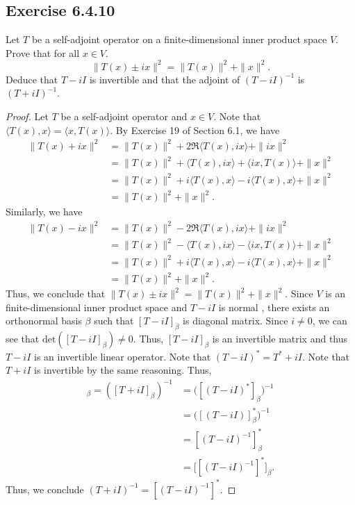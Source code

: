 \subsection*{Exercise 6.4.10} Let \( T  \) be a self-adjoint operator on a finite-dimensional inner product space \( V  \). Prove that for all \( x \in V  \).
\[ \|T(x) \pm ix\|^{2} = \|T(x)\|^{2} + \|x\|^{2}.  \]
Deduce that \( T - i I  \) is invertible and that the adjoint of \( (T - iI )^{-1} \) is \( (T + i I )^{-1} \).
\begin{proof}
Let \( T  \) be a self-adjoint operator and \( x \in V  \). Note that \( \langle T(x)  , x  \rangle = \langle x , T(x) \rangle \). By Exercise 19 of Section 6.1, we have
\begin{align*}
    \|T(x) + ix \|^{2} &= \|T(x)\|^{2} + 2 \Re \langle T(x) , ix  \rangle + \|ix \|^{2} \\
                       &= \|T(x)\|^{2} + \langle T(x)  , ix  \rangle + \langle ix  , T(x)  \rangle + \|x\|^{2}  \\
                       &= \|T(x)\|^{2} +  i \langle T(x)   , x \rangle - i \langle T(x)  , x  \rangle + \|x\|^{2} \\  
                       &= \|T(x)\|^{2} + \|x\|^{2}.
\end{align*}
Similarly, we have
\begin{align*}
    \|T(x) - ix \|^{2} &= \|T(x)\|^{2} - 2 \Re \langle T(x) , ix  \rangle + \|ix\|^{2} \\
                       &= \|T(x)\|^{2} - \langle T(x)  , ix  \rangle - \langle ix , T(x) \rangle + \|x\|^{2} \\
                       &= \|T(x)\|^{2} + i \langle T(x)  , x  \rangle - i \langle T(x)  , x  \rangle + \|x\|^{2} \\
                       &= \|T(x)\|^{2} + \|x\|^{2}.
\end{align*}
Thus, we conclude that \( \|T(x) \pm ix\|^{2} = \|T(x)\|^{2} + \|x\|^{2} \). Since \( V  \) is an finite-dimensional inner product space and \( T - iI  \) is normal , there exists an orthonormal basis \(  \beta \) such that  \( [T - iI]_{\beta} \) is diagonal matrix. Since \( i \neq 0  \), we can see that \( \text{det}([T - i I ]_{\beta}) \neq 0  \). Thus, \( [T - iI ]_{\beta} \) is an invertible matrix and thus \( T - iI  \) is an invertible linear operator. Note that \( (T - iI)^{*} = T^{*} + iI \). Note that \( T + iI  \) is invertible by the same reasoning. Thus, 
\begin{align*}
    [(T + iI)^{-1}]_{\beta} = ([T+iI]_{\beta})^{-1} &= \Big( [(T - iI)^{*}]_{\beta} \Big)^{-1} \\
                                                    &= \Big(  [(T - iI)]_{\beta}^{*} \Big)^{-1} \\
                                                    &= [(T- iI)^{-1}]_{\beta}^{*} \\
                                                    &= \Big[ [(T - iI)^{-1} ]^{*} \Big]_{\beta}.
\end{align*}
Thus, we conclude \( (T+iI)^{-1} = [(T - iI)^{-1}]^{*}   \).
\end{proof}

